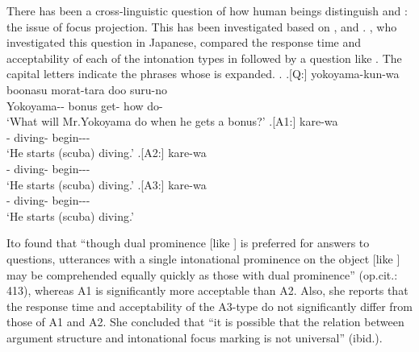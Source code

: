 There has been a cross-linguistic question of how
human beings distinguish  and :
the issue of focus projection.
This has been investigated based on ,  and 
\cite{selkirk84,gussenhoven83}.
, who investigated this question in Japanese,
compared the response time and acceptability of each of the intonation types in \Next[A1-A3]
followed by a  question like \Next[Q].
The capital letters indicate the phrases whose  is expanded.
\ex.
 \ag.[Q:] yokoyama-kun-wa boonasu morat-tara doo suru-no \\
          Yokoyama-- bonus get- how do- \\
          `What will Mr.Yokoyama do when he gets a bonus?'
 \bg.[A1:] kare-wa   \\
           - diving- begin--- \\
           `He starts (scuba) diving.'
 \bg.[A2:] kare-wa   \\
           - diving- begin--- \\
           `He starts (scuba) diving.'
 \bg.[A3:] kare-wa   \\
           - diving- begin--- \\
           `He starts (scuba) diving.'
      \hfill{\cite[412]{ito02}}

Ito found that
``though dual prominence [like \Last[A1]] is preferred for answers to  questions,
utterances with a single intonational prominence on the object [like \Last[A2]] may be comprehended equally quickly as those with dual prominence'' (op.cit.: 413),
whereas A1 is significantly more acceptable than A2.
Also, she reports that the response time and acceptability of the A3-type do not significantly differ from those of A1 and A2.
She concluded that
``it is possible that the relation between argument structure and intonational focus marking is not universal'' (ibid.).

